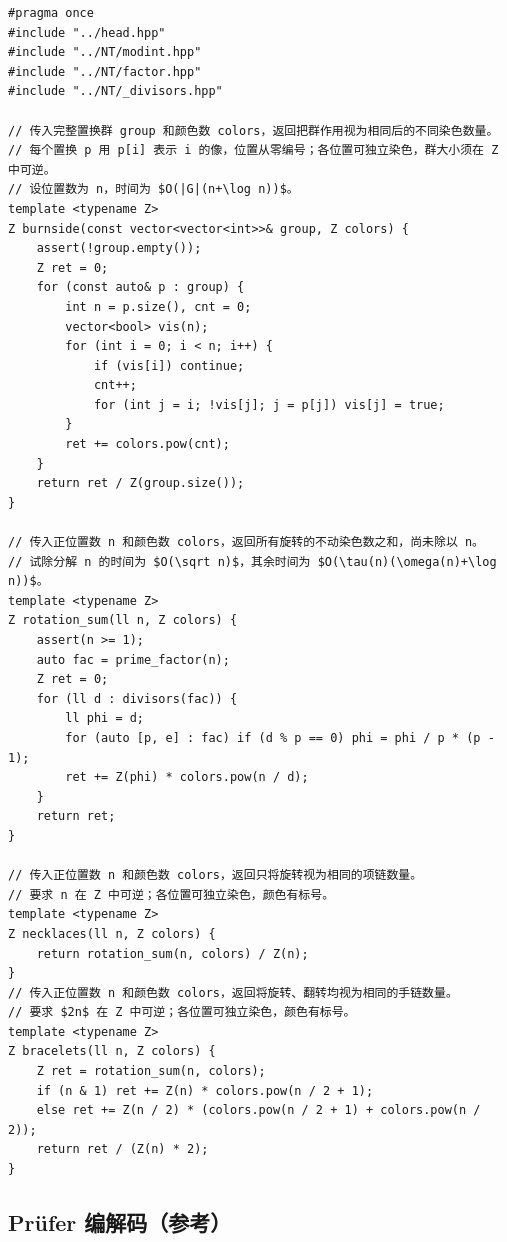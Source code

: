 \begin{lstlisting}
#pragma once
#include "../head.hpp"
#include "../NT/modint.hpp"
#include "../NT/factor.hpp"
#include "../NT/_divisors.hpp"

// 传入完整置换群 group 和颜色数 colors，返回把群作用视为相同后的不同染色数量。
// 每个置换 p 用 p[i] 表示 i 的像，位置从零编号；各位置可独立染色，群大小须在 Z 中可逆。
// 设位置数为 n，时间为 $O(|G|(n+\log n))$。
template <typename Z>
Z burnside(const vector<vector<int>>& group, Z colors) {
    assert(!group.empty());
    Z ret = 0;
    for (const auto& p : group) {
        int n = p.size(), cnt = 0;
        vector<bool> vis(n);
        for (int i = 0; i < n; i++) {
            if (vis[i]) continue;
            cnt++;
            for (int j = i; !vis[j]; j = p[j]) vis[j] = true;
        }
        ret += colors.pow(cnt);
    }
    return ret / Z(group.size());
}

// 传入正位置数 n 和颜色数 colors，返回所有旋转的不动染色数之和，尚未除以 n。
// 试除分解 n 的时间为 $O(\sqrt n)$，其余时间为 $O(\tau(n)(\omega(n)+\log n))$。
template <typename Z>
Z rotation_sum(ll n, Z colors) {
    assert(n >= 1);
    auto fac = prime_factor(n);
    Z ret = 0;
    for (ll d : divisors(fac)) {
        ll phi = d;
        for (auto [p, e] : fac) if (d % p == 0) phi = phi / p * (p - 1);
        ret += Z(phi) * colors.pow(n / d);
    }
    return ret;
}

// 传入正位置数 n 和颜色数 colors，返回只将旋转视为相同的项链数量。
// 要求 n 在 Z 中可逆；各位置可独立染色，颜色有标号。
template <typename Z>
Z necklaces(ll n, Z colors) {
    return rotation_sum(n, colors) / Z(n);
}
// 传入正位置数 n 和颜色数 colors，返回将旋转、翻转均视为相同的手链数量。
// 要求 $2n$ 在 Z 中可逆；各位置可独立染色，颜色有标号。
template <typename Z>
Z bracelets(ll n, Z colors) {
    Z ret = rotation_sum(n, colors);
    if (n & 1) ret += Z(n) * colors.pow(n / 2 + 1);
    else ret += Z(n / 2) * (colors.pow(n / 2 + 1) + colors.pow(n / 2));
    return ret / (Z(n) * 2);
}
\end{lstlisting}

\subsection{Prüfer 编解码（参考）}
\par

